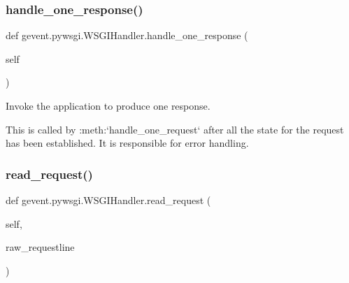 \subsubsection{\texorpdfstring{handle\+\_\+one\+\_\+response()}{handle\_one\_response()}}
{\footnotesize\ttfamily def gevent.\+pywsgi.\+W\+S\+G\+I\+Handler.\+handle\+\_\+one\+\_\+response (\begin{DoxyParamCaption}\item[{}]{self }\end{DoxyParamCaption})}

\begin{DoxyVerb}Invoke the application to produce one response.

This is called by :meth:`handle_one_request` after all the
state for the request has been established. It is responsible
for error handling.
\end{DoxyVerb}
 \mbox{\label{classgevent_1_1pywsgi_1_1_w_s_g_i_handler_a103b72c59b3ba0c92b1046fc1904273a}} 
\subsubsection{\texorpdfstring{read\+\_\+request()}{read\_request()}}
{\footnotesize\ttfamily def gevent.\+pywsgi.\+W\+S\+G\+I\+Handler.\+read\+\_\+request (\begin{DoxyParamCaption}\item[{}]{self,  }\item[{}]{raw\+\_\+requestline }\end{DoxyParamCaption})}

